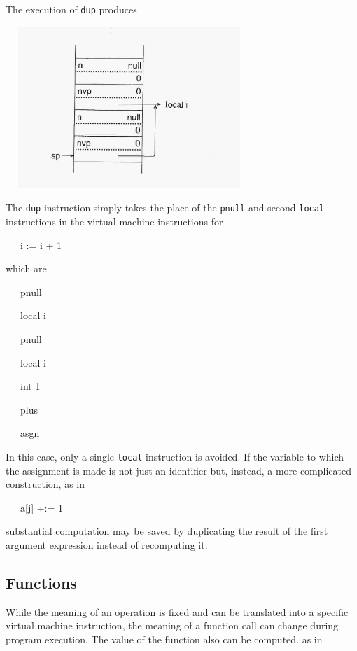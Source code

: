 The execution of \texttt{dup} produces


\ \  \includegraphics[width=3.4193in,height=2.4075in]{ib-img/ib-img056.jpg} 


The \texttt{dup} instruction simply takes the place of the
\texttt{pnull} and second \texttt{local} instructions in the virtual
machine instructions for

{\ttfamily\mdseries
\ \ \ i := i + 1}

which are

{\ttfamily\mdseries
\ \ \ pnull}

{\ttfamily\mdseries
\ \ \ local i}

{\ttfamily\mdseries
\ \ \ pnull}

{\ttfamily\mdseries
\ \ \ local i}

{\ttfamily\mdseries
\ \ \ int 1}

{\ttfamily\mdseries
\ \ \ plus}

{\ttfamily\mdseries
\ \ \ asgn}


In this case, only a single \texttt{local} instruction is avoided. If
the variable to which the assignment is made is not just an identifier
but, instead, a more complicated construction, as in

{\ttfamily\mdseries
\ \ \ a[j] +:= 1}

\noindent substantial computation may be saved by duplicating the
result of the first argument expression instead of recomputing it.

\subsection{Functions}

While the meaning of an operation is fixed and can be translated into
a specific virtual machine instruction, the meaning of a function call
can change during program execution. The value of the function also
can be computed. as in

